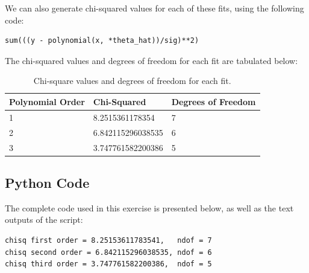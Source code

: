 \documentclass[a4paper]{article}
\begin{document}
We can also generate chi-squared values for each of these fits, using the following code:
\begin{lstlisting}
sum(((y - polynomial(x, *theta_hat))/sig)**2)
\end{lstlisting}
The chi-squared values and degrees of freedom for each fit are tabulated below:
\begin{table}[h!]
\centering
\begin{tabular}{lll}
\hline
Polynomial Order & Chi-Squared       & Degrees of Freedom \\ \hline
1                & 8.2515361178354   & 7                  \\
2                & 6.842115296038535 & 6                  \\
3                & 3.747761582200386 & 5                  \\ \hline

\end{tabular}
\caption{\label{tab:chi-sq}Chi-square values and degrees of freedom for each fit.}
\end{table}
\newpage
\begin{appendix}
\section{Python Code}\label{sec:python}
The complete code used in this exercise is presented below, as well as the text outputs of the script:
%
\begin{lstlisting}
chisq first order = 8.25153611783541,	ndof = 7
chisq second order = 6.842115296038535,	ndof = 6
chisq third order = 3.747761582200386,	ndof = 5
\end{lstlisting}

\end{appendix}
\end{document}
